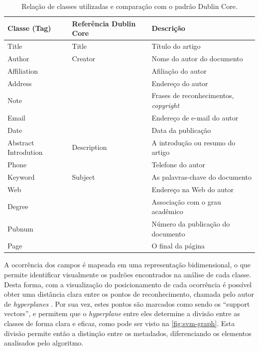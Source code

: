 \begin{table}
    \caption{Relação de classes utilizadas e comparação com o padrão Dublin Core.}
    \begin{center}
        \begin{tabular}{|C{3cm}|C{3cm}|p{7cm}|}
            \hline \textbf{Classe (Tag)} & \textbf{Referência Dublin Core} & \textbf{Descrição}\\ 
            \hline Title & Title & Título do artigo\\
            \hline Author & Creator & Nome do autor do documento\\
            \hline Affiliation & & Afiliação do autor\\
            \hline Address & & Endereço do autor\\
            \hline Note & & Frases de reconhecimentos, \textit{copyright}\\
            \hline Email & & Endereço de e-mail do autor\\
            \hline Date & & Data da publicação\\
            \hline Abstract Introdution & Description & A introdução ou resumo do artigo\\
            \hline Phone & & Telefone do autor\\
            \hline Keyword & Subject & As palavras-chave do documento\\
            \hline Web & & Endereço na Web do autor\\
            \hline Degree & & Associação com o grau acadêmico\\
            \hline Pubnum & & Número da publicação do documento\\
            \hline Page & & O final da página\\
            \hline
        \end{tabular}
    \end{center}
    \label{tab:svm-classes}
\end{table}

A ocorrência dos campos é mapeada em uma representação bidimensional, o que permite identificar visualmente os padrões encontrados na análise de cada classe. Desta forma, com a visualização do posicionamento de cada ocorrência é possível obter uma distância clara entre os pontos de reconhecimento, chamada pelo autor de \textit{hyperplanes} \cite{Vapnik-SVM}. Por sua vez, estes pontos são marcados como sendo os ``support vectors'', e permitem que o \textit{hyperplane} entre eles determine a divisão entre as classes de forma clara e eficaz, como pode ser visto na \autoref{fig:svm-graph}. Esta divisão permite então a distinção entre os metadados, diferenciando os elementos analisados pelo algoritmo.

